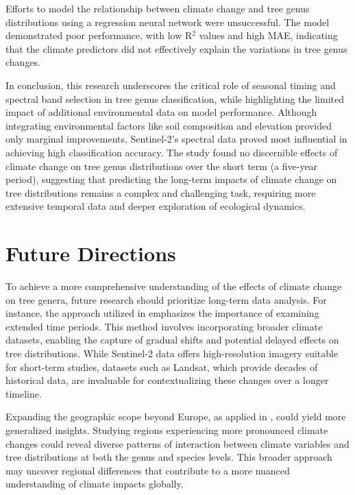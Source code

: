 Efforts to model the relationship between climate change and tree genus distributions using a regression neural network were unsuccessful. The model demonstrated poor performance, with low R$^2$ values and high MAE, indicating that the climate predictors did not effectively explain the variations in tree genus changes.

In conclusion, this research underscores the critical role of seasonal timing and spectral band selection in tree genus classification, while highlighting the limited impact of additional environmental data on model performance. Although integrating environmental factors like soil composition and elevation provided only marginal improvements, Sentinel-2's spectral data proved most influential in achieving high classification accuracy. The study found no discernible effects of climate change on tree genus distributions over the short term (a five-year period), suggesting that predicting the long-term impacts of climate change on tree distributions remains a complex and challenging task, requiring more extensive temporal data and deeper exploration of ecological dynamics.

\section{Future Directions}

To achieve a more comprehensive understanding of the effects of climate change on tree genera, future research should prioritize long-term data analysis. For instance, the approach utilized in \cite{pakistan} emphasizes the importance of examining extended time periods. This method involves incorporating broader climate datasets, enabling the capture of gradual shifts and potential delayed effects on tree distributions. While Sentinel-2 data offers high-resolution imagery suitable for short-term studies, datasets such as Landsat, which provide decades of historical data, are invaluable for contextualizing these changes over a longer timeline.

Expanding the geographic scope beyond Europe, as applied in \cite{plantedforest}, could yield more generalized insights. Studying regions experiencing more pronounced climate changes could reveal diverse patterns of interaction between climate variables and tree distributions at both the genus and species levels. This broader approach may uncover regional differences that contribute to a more nuanced understanding of climate impacts globally.

